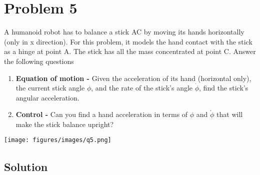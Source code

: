 \section*{Problem 5}

A humanoid robot has to balance a stick AC by moving its hands horizontally (only in x direction).
For this problem, it models the hand contact with the stick as a hinge at point A.
The stick has all the mass concentrated at point C.
Answer the following questions

\begin{enumerate}[label = (\alph*)]
    \item \textbf{Equation of motion -} Given the acceleration of its hand (horizontal only), the current stick angle \( \phi \), and the rate of the stick's angle \( \dot\phi \), find the stick's angular acceleration.
    \item \textbf{Control -} Can you find a hand acceleration in terms of \( \phi \) and \( \dot\phi \) that will make the stick balance upright?
\end{enumerate}

\begin{figure*}[h]
    \centering
    \texttt{[image: figures/images/q5.png]}
\end{figure*}

\subsection*{Solution}
